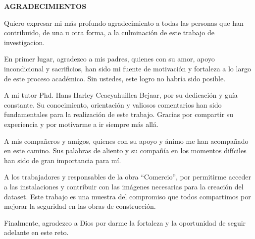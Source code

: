 \thispagestyle{plain}

\begin{center}
  \textbf{AGRADECIMIENTOS}
\end{center}

\vspace{1cm}

\noindent

Quiero expresar mi más profundo agradecimiento a todas las personas que han contribuido, de una u otra forma, a la culminación de este trabajo de investigacion.

En primer lugar, agradezco a mis padres, quienes con su amor, apoyo incondicional y sacrificios, han sido mi fuente de motivación y fortaleza a lo largo de este proceso académico. Sin ustedes, este logro no habría sido posible.

A mi tutor Phd. Hans Harley Ccacyahuillca Bejaar, por su dedicación y guía constante. Su conocimiento, orientación y valiosos comentarios han sido fundamentales para la realización de este trabajo. Gracias por compartir su experiencia y por motivarme a ir siempre más allá.

A mis compañeros y amigos, quienes con su apoyo y ánimo me han acompañado en este camino. Sus palabras de aliento y su compañía en los momentos difíciles han sido de gran importancia para mí.

A los trabajadores y responsables de la obra ``Comercio'', por permitirme acceder a las instalaciones y contribuir con las imágenes necesarias para la creación del dataset. Este trabajo es una muestra del compromiso que todos compartimos por mejorar la seguridad en las obras de construcción.

Finalmente, agradezco a Dios por darme la fortaleza y la oportunidad de seguir adelante en este reto.

\vfill

\pagebreak